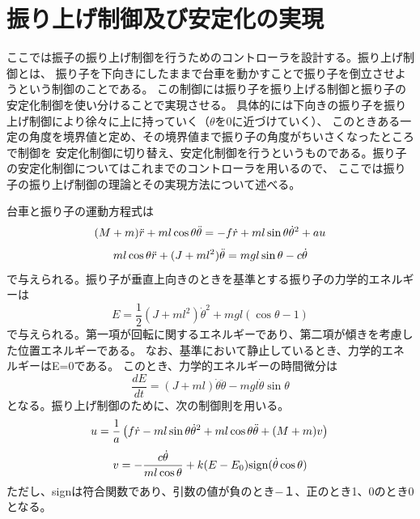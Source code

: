 \section{振り上げ制御及び安定化の実現}
	ここでは振子の振り上げ制御を行うためのコントローラを設計する。振り上げ制御とは、
	振り子を下向きにしたままで台車を動かすことで振り子を倒立させようという制御のことである。
	この制御には振り子を振り上げる制御と振り子の安定化制御を使い分けることで実現させる。
	具体的には下向きの振り子を振り上げ制御により徐々に上に持っていく（$\theta$を0に近づけていく）、
	このときある一定の角度を境界値と定め、その境界値まで振り子の角度がちいさくなったところで制御を
	安定化制御に切り替え、安定化制御を行うというものである。振り子の安定化制御についてはこれまでのコントローラを用いるので、
	ここでは振り子の振り上げ制御の理論とその実現方法について述べる。
	\par
	台車と振り子の運動方程式は
	\begin{equation}
		(M+m)\ddot{r}+ml\cos{\theta}\ddot{\theta} = -f\dot{r} + ml\sin{\theta}\dot{\theta}^{2}+au\\
		\label{eq:huriage2}
	\end{equation}
	\begin{equation}
		ml\cos{\theta}\ddot{r}+(J+ml^{2})\ddot{\theta} = mgl\sin{\theta}-c\dot{\theta}\\
		\label{eq:huriage5}
	\end{equation}
	で与えられる。振り子が垂直上向きのときを基準とする振り子の力学的エネルギーは
	\[
		E = \frac{1}{2}(J+ml^{2})\dot{\theta}^{2}+mgl(\cos{\theta}-1)
	\]
	で与えられる。第一項が回転に関するエネルギーであり、第二項が傾きを考慮した位置エネルギーである。
	なお、基準において静止しているとき、力学的エネルギーはE=0である。
	このとき、力学的エネルギーの時間微分は
	\begin{equation}
		\frac{dE}{dt} = (J+ml)\dot{\theta}\ddot{\theta}-mgl\dot{\theta}\sin{\theta}
		\label{eq:huriage6}
	\end{equation}
	となる。振り上げ制御のために、次の制御則を用いる。
	\begin{equation}
		u = \frac{1}{a}\left(f\dot{r} - ml\sin{\theta}\dot{\theta}^{2} + ml\cos{\theta}\ddot{\theta} + (M+m)v \right)\\
		\label{eq:huriage1}
	\end{equation}
	\begin{equation}
		v = -\frac{c\dot{\theta}}{ml\cos{\theta}}+k(E-E_{0})\rm{sign}(\dot{\theta}\cos{\theta})
		\label{eq:huriage4}
	\end{equation}
	ただし、signは符合関数であり、引数の値が負のとき$-１$、正のとき1、0のとき0となる。
